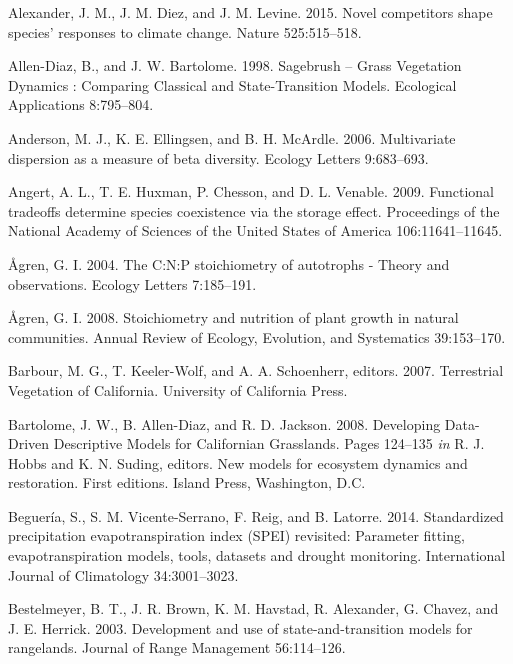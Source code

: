 \documentclass[twoside,12pt,final]{ucthesis-CA2012}
\begin{document}
\begin{ucmainmatter}
\leavevmode\hypertarget{ref-Alexander2015}{}%
Alexander, J. M., J. M. Diez, and J. M. Levine. 2015. Novel competitors shape species' responses to climate change. Nature 525:515--518.

\leavevmode\hypertarget{ref-Allen-Diaz1998}{}%
Allen-Diaz, B., and J. W. Bartolome. 1998. Sagebrush -- Grass Vegetation Dynamics : Comparing Classical and State-Transition Models. Ecological Applications 8:795--804.

\leavevmode\hypertarget{ref-Anderson2006}{}%
Anderson, M. J., K. E. Ellingsen, and B. H. McArdle. 2006. Multivariate dispersion as a measure of beta diversity. Ecology Letters 9:683--693.

\leavevmode\hypertarget{ref-Angert2009}{}%
Angert, A. L., T. E. Huxman, P. Chesson, and D. L. Venable. 2009. Functional tradeoffs determine species coexistence via the storage effect. Proceedings of the National Academy of Sciences of the United States of America 106:11641--11645.

\leavevmode\hypertarget{ref-Agren2004}{}%
Ågren, G. I. 2004. The C:N:P stoichiometry of autotrophs - Theory and observations. Ecology Letters 7:185--191.

\leavevmode\hypertarget{ref-Agren2008}{}%
Ågren, G. I. 2008. Stoichiometry and nutrition of plant growth in natural communities. Annual Review of Ecology, Evolution, and Systematics 39:153--170.

\leavevmode\hypertarget{ref-Barbour2007}{}%
Barbour, M. G., T. Keeler-Wolf, and A. A. Schoenherr, editors. 2007. Terrestrial Vegetation of California. University of California Press.

\leavevmode\hypertarget{ref-Bartolome2008}{}%
Bartolome, J. W., B. Allen-Diaz, and R. D. Jackson. 2008. Developing Data-Driven Descriptive Models for Californian Grasslands. Pages 124--135 \emph{in} R. J. Hobbs and K. N. Suding, editors. New models for ecosystem dynamics and restoration. First editions. Island Press, Washington, D.C.

\leavevmode\hypertarget{ref-Begueria2014}{}%
Beguería, S., S. M. Vicente-Serrano, F. Reig, and B. Latorre. 2014. Standardized precipitation evapotranspiration index (SPEI) revisited: Parameter fitting, evapotranspiration models, tools, datasets and drought monitoring. International Journal of Climatology 34:3001--3023.

\leavevmode\hypertarget{ref-Bestelmeyer2003}{}%
Bestelmeyer, B. T., J. R. Brown, K. M. Havstad, R. Alexander, G. Chavez, and J. E. Herrick. 2003. Development and use of state-and-transition models for rangelands. Journal of Range Management 56:114--126.


\end{ucmainmatter}
\end{document}
